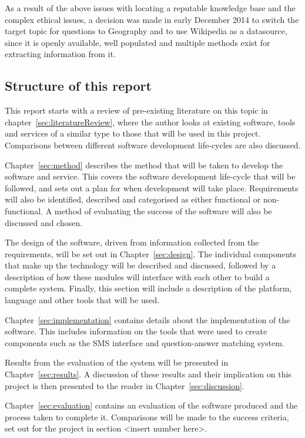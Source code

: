 \documentclass{article}
\begin{document}
As a result of the above issues with locating a reputable knowledge base and the complex ethical issues, a decision was made in early December 2014 to switch the target topic for questions to Geography and to use Wikipedia as a datasource, since it is openly available, well populated and multiple methods exist for extracting information from it.

\subsection{Structure of this report}
This report starts with a review of pre-existing literature on this topic in chapter~\ref{sec:literatureReview}, where the author looks at existing software, tools and services of a similar type to those that will be used in this project.  Comparisons between different software development life-cycles are also discussed.

Chapter~\ref{sec:method} describes the method that will be taken to develop the software and service.  This covers the software development life-cycle that will be followed, and sets out a plan for when development will take place.  Requirements will also be identified, described and categorised  as either functional or non-functional.  A method of evaluating the success of the software will also be discussed and chosen.

The design of the software, driven from information collected from the requirements, will be set out in Chapter~\ref{sec:design}.  The individual components that make up the technology will be described and discussed, followed by a description of how these modules will interface with each other to build a complete system.  Finally, this section will include a description of the platform, language and other tools that will be used.

Chapter~\ref{sec:implementation} contains details about the implementation of the software.  This includes information on the tools that were used to create components such as the SMS interface and question-answer matching system.

Results from the evaluation of the system will be presented in Chapter~\ref{sec:results}.  A discussion of these results and their implication on this project is then presented to the reader in Chapter~\ref{sec:discussion}.

Chapter~\ref{sec:evaluation} contains an evaluation of the software produced and the process taken to complete it.  Comparisons will be made to the success criteria, set out for the project in section <insert number here>.
\end{document}
